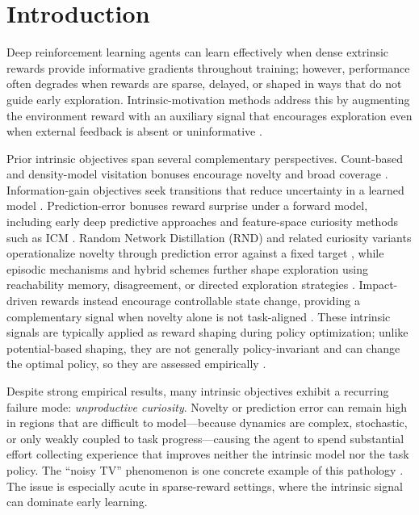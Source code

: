 \section{Introduction}
\label{sec:introduction}

Deep reinforcement learning agents can learn effectively when dense extrinsic rewards provide informative gradients throughout training; however, performance often degrades when rewards are sparse, delayed, or shaped in ways that do not guide early exploration.
Intrinsic-motivation methods address this by augmenting the environment reward with an auxiliary signal that encourages exploration even when external feedback is absent or uninformative \cite{singh-2004,barto-2012,oudeyer-2007A,oudeyer-2007B}.

Prior intrinsic objectives span several complementary perspectives.
Count-based and density-model visitation bonuses encourage novelty and broad coverage \cite{bellemare-2016,tang-2016,ostrovski-2017}.
Information-gain objectives seek transitions that reduce uncertainty in a learned model \cite{houthooft-2016}.
Prediction-error bonuses reward surprise under a forward model, including early deep predictive approaches \cite{stadie-2015} and feature-space curiosity methods such as ICM \cite{pathak-2017}.
Random Network Distillation (RND) and related curiosity variants operationalize novelty through prediction error against a fixed target \cite{burda-2018B,burda-2018A}, while episodic mechanisms and hybrid schemes further shape exploration using reachability memory, disagreement, or directed exploration strategies \cite{savinov-2018,pathak-2019,badia-2020}.
Impact-driven rewards instead encourage controllable state change, providing a complementary signal when novelty alone is not task-aligned \cite{raileanu-2020}.
These intrinsic signals are typically applied as reward shaping during policy optimization; unlike potential-based shaping, they are not generally policy-invariant and can change the optimal policy, so they are assessed empirically \cite{ng-1999}.

Despite strong empirical results, many intrinsic objectives exhibit a recurring failure mode: \emph{unproductive curiosity}.
Novelty or prediction error can remain high in regions that are difficult to model---because dynamics are complex, stochastic, or only weakly coupled to task progress---causing the agent to spend substantial effort collecting experience that improves neither the intrinsic model nor the task policy.
The ``noisy TV'' phenomenon is one concrete example of this pathology \cite{mavor-parker-2021}.
The issue is especially acute in sparse-reward settings, where the intrinsic signal can dominate early learning.

